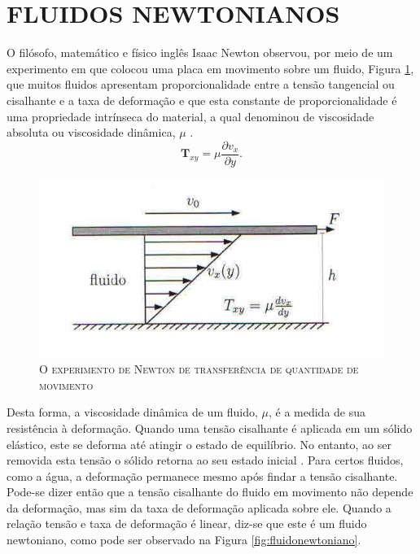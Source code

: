 \section{FLUIDOS NEWTONIANOS} \label{Flui_New}

	


O filósofo, matemático e físico inglês Isaac Newton observou, por meio de um experimento em que colocou uma placa em movimento sobre um fluido, Figura \ref{fig:expnewton}, que muitos fluidos apresentam proporcionalidade entre a tensão tangencial ou cisalhante e a taxa de deformação e que esta constante de proporcionalidade é uma propriedade intrínseca do material, a qual denominou de viscosidade absoluta ou viscosidade dinâmica, $ \mu $ \cite{Marchetti}.
\begin{equation}
\textbf{T} _{xy} = \mu \dfrac{\partial v_{x}}{\partial y}.
\end{equation}

\begin{figure}[H]
	\centering
	\includegraphics[scale=1]{figuras/experimento_de_newton.jpg}
	\caption{\footnotesize{\textsc{O experimento de Newton de transferência de quantidade de movimento}}}
	\vspace{-0.1cm}
	\label{fig:expnewton}
\end{figure} 

Desta forma, a viscosidade dinâmica de um fluido, $ \mu $, é a medida de sua resistência à deformação.
Quando uma tensão cisalhante é aplicada em um sólido elástico, este se deforma até atingir o estado de equilíbrio. No entanto, ao ser removida esta tensão o sólido retorna ao seu estado inicial \cite{Lai}. 
Para certos fluidos, como a água, a deformação permanece mesmo após findar a tensão cisalhante. Pode-se dizer então que a tensão cisalhante do fluido em movimento não depende da deformação, mas sim da taxa de deformação aplicada sobre ele. Quando a relação tensão e taxa de deformação é linear, diz-se que este é um fluido newtoniano, como pode ser observado na Figura \ref{fig:fluidonewtoniano}.    


